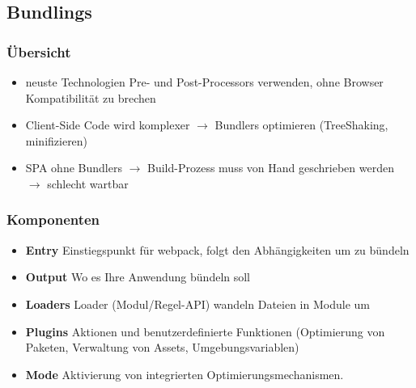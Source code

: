 
\subsection{Bundlings}

\subsubsection{Übersicht}
\begin{itemize}
    \item neuste Technologien Pre- und Post-Processors verwenden, ohne Browser Kompatibilität zu brechen
    \item Client-Side Code wird komplexer $\rightarrow$ Bundlers optimieren (TreeShaking, minifizieren)
    \item SPA ohne Bundlers $\rightarrow$ Build-Prozess muss von Hand geschrieben werden $\rightarrow$ schlecht wartbar
\end{itemize}

\subsubsection{Komponenten}
\begin{itemize}
    \item \textbf{Entry}
    Einstiegspunkt für webpack, folgt den Abhängigkeiten um zu bündeln
    \item \textbf{Output}
    Wo es Ihre Anwendung bündeln soll
    \item \textbf{Loaders}
    Loader (Modul/Regel-API) wandeln Dateien in Module um
    \item \textbf{Plugins}
    Aktionen und benutzerdefinierte Funktionen (Optimierung von Paketen, Verwaltung von Assets, Umgebungsvariablen)
    \item \textbf{Mode}
    Aktivierung von integrierten Optimierungsmechanismen.
\end{itemize}